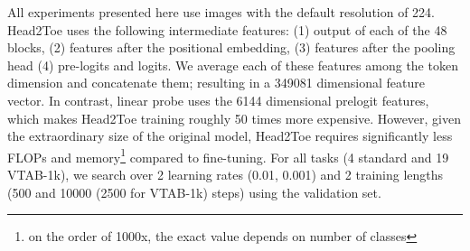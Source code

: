 All experiments presented here use images with the default resolution of 224. Head2Toe uses the following intermediate features: (1) output of each of the 48 blocks, (2) features after the positional embedding, (3) features after the pooling head (4) pre-logits and logits. We average each of these features among the token dimension and concatenate them; resulting in a 349081 dimensional feature vector. In contrast, linear probe uses the 6144 dimensional prelogit features, which makes Head2Toe training roughly 50 times more expensive. However, given the extraordinary size of the original model, Head2Toe requires significantly less FLOPs and memory\footnote{on the order of 1000x, the exact value depends on number of classes} compared to fine-tuning. For all tasks (4 standard and 19 VTAB-1k), we search over 2 learning rates (0.01, 0.001) and 2 training lengths (500 and 10000 (2500 for VTAB-1k) steps) using the validation set.

